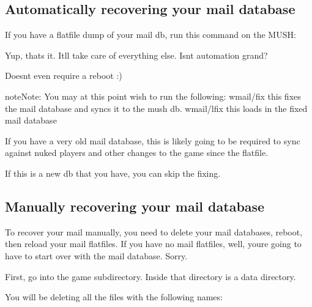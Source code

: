 \documentclass[letterpaper,10pt,english]{sphinxmanual}
\begin{document}
\subsection{Automatically recovering your mail database}
\label{\detokenize{troubleshooting:automatically-recovering-your-mail-database}}
\sphinxAtStartPar
If you have a flatfile dump of your mail db, run this command on the MUSH:

\begin{sphinxVerbatim}[commandchars=\\\{\}]
\end{sphinxVerbatim}

\sphinxAtStartPar
Yup, that\textquotesingle{}s it.  It\textquotesingle{}ll take care of everything else.  Isn\textquotesingle{}t automation grand?

\sphinxAtStartPar
Doesn\textquotesingle{}t even require a reboot :)

\begin{sphinxadmonition}{note}{Note:}
\sphinxAtStartPar
You may at this point wish to run the following:
wmail/fix  \sphinxhyphen{}\sphinxhyphen{} this fixes the mail database and sync\textquotesingle{}s it to the mush db.
wmail/lfix \sphinxhyphen{}\sphinxhyphen{} this loads in the fixed mail database
\end{sphinxadmonition}

\sphinxAtStartPar
If you have a very old mail database, this is likely going to be required
to sync against nuked players and other changes to the game since the flatfile.

\sphinxAtStartPar
If this is a new db that you have, you can skip the fixing.


\subsection{Manually recovering your mail database}
\label{\detokenize{troubleshooting:manually-recovering-your-mail-database}}
\sphinxAtStartPar
To recover your mail manually, you need to delete your mail databases,
reboot, then reload your mail flatfiles.  If you have no mail flatfiles,
well, you\textquotesingle{}re going to have to start over with the mail database.  Sorry.

\sphinxAtStartPar
First, go into the \textquotesingle{}game\textquotesingle{} subdirectory.  Inside that directory is a \textquotesingle{}data\textquotesingle{}
directory.

\sphinxAtStartPar
You will be deleting all the files with the following names:
\end{document}
